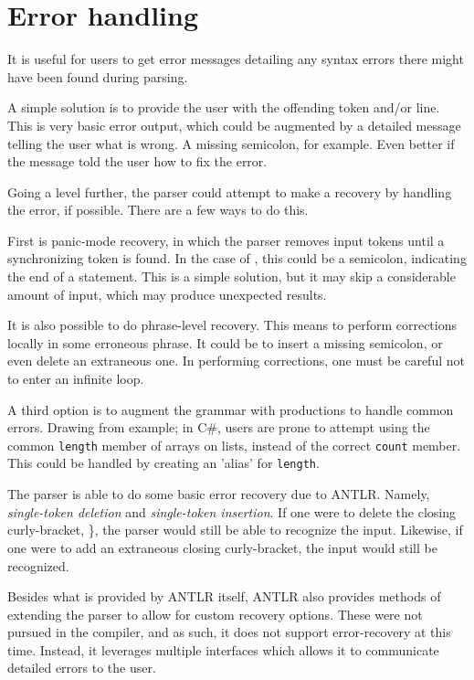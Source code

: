 \section{Error handling}
It is useful for users to get error messages detailing any syntax errors there might have been found during parsing.

A simple solution is to provide the user with the offending token and/or line. This is very basic error output, which could be augmented by a detailed message telling the user what is wrong. A missing semicolon, for example. Even better if the message told the user how to fix the error. 

Going a level further, the parser could attempt to make a recovery by handling the error, if possible. There are a few ways to do this.

First is panic-mode recovery, in which the parser removes input tokens until a synchronizing token is found. In the case of \dazel{}, this could be a semicolon, indicating the end of a statement. This is a simple solution, but it may skip a considerable amount of input, which may produce unexpected results\cite{crafting_a_compiler}.

It is also possible to do phrase-level recovery. This means to perform corrections locally in some erroneous phrase. It could be to insert a missing semicolon, or even delete an extraneous one. In performing corrections, one must be careful not to enter an infinite loop\cite{spo_course}.

A third option is to augment the grammar with productions to handle common errors\cite{spo_course}. Drawing from example; in C\#, users are prone to attempt using the common \texttt{length} member of arrays on lists, instead of the correct \texttt{count} member. This could be handled by creating an 'alias' for \texttt{length}.

The \dazel{} parser is able to do some basic error recovery due to ANTLR. Namely, \textit{single-token deletion} and \textit{single-token insertion}. If one were to delete the closing curly-bracket, \}, the parser would still be able to recognize the input. Likewise, if one were to add an extraneous closing curly-bracket, the input would still be recognized.

Besides what is provided by ANTLR itself, ANTLR also provides methods of extending the parser to allow for custom recovery options. These were not pursued in the \dazel{} compiler, and as such, it does not support error-recovery at this time. Instead, it leverages multiple interfaces which allows it to communicate detailed errors to the user.

